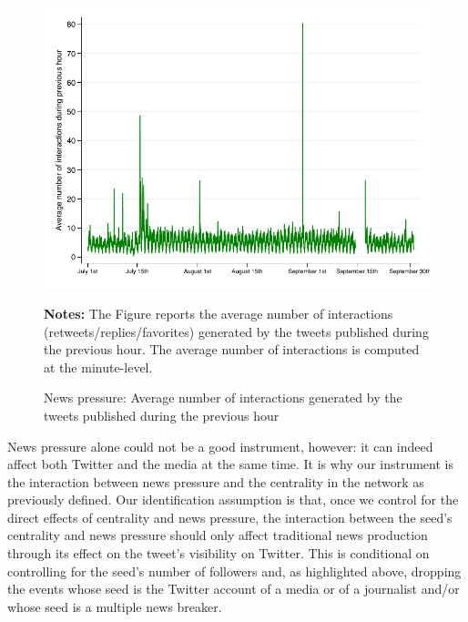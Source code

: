 \begin{figure}
\begin{center}
\includegraphics[scale=1]{figures/news_pressure_hour_illustration}
\end{center}
	\begin{spacing}{0.5}
		{\footnotesize \textbf{Notes:} The Figure reports the average number of interactions (retweets/replies/favorites) generated by the tweets published during the previous hour. The average number of interactions is computed at the minute-level.}
	\end{spacing}
\vspace{.5cm}	
	\caption{News pressure: Average number of interactions generated by the tweets published during the previous hour}
	\label{fig:news_pressure_hour_illustration}
\end{figure}

 
News pressure alone could not be a good instrument, however: it can indeed affect both Twitter and the media at the same time. It is why our instrument is the interaction between news pressure and the centrality in the network as previously defined. Our identification assumption is that, once we control for the direct effects of centrality and news pressure, the interaction between the seed's centrality and news pressure should only affect traditional news production through its effect on the tweet's visibility on Twitter. This is conditional on controlling for the seed's number of followers and, as highlighted above, dropping the events whose seed is the Twitter account of a media or of a journalist and/or whose seed is a multiple news breaker.



